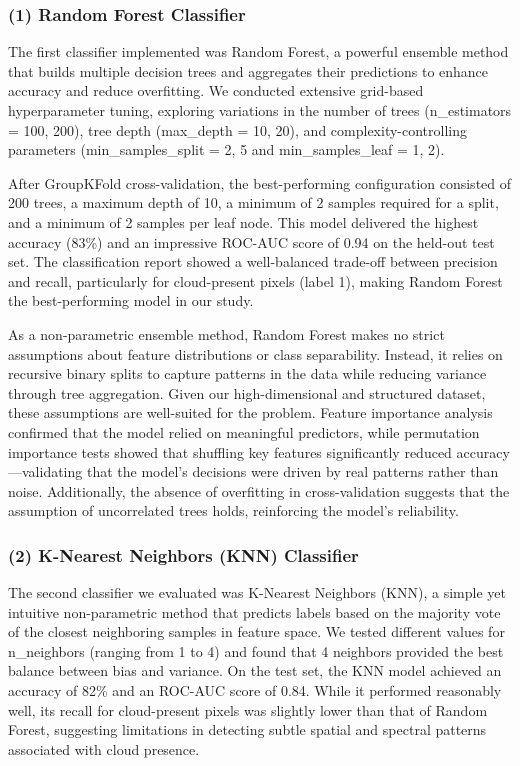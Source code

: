 \documentclass[11pt]{article}
\begin{document}
\subsubsection*{(1) Random Forest
Classifier}\label{random-forest-classifier}

The first classifier implemented was Random Forest, a powerful ensemble
method that builds multiple decision trees and aggregates their
predictions to enhance accuracy and reduce overfitting. We conducted
extensive grid-based hyperparameter tuning, exploring variations in the
number of trees (n\_estimators = 100, 200), tree depth (max\_depth = 10,
20), and complexity-controlling parameters (min\_samples\_split = 2, 5
and min\_samples\_leaf = 1, 2).

After GroupKFold cross-validation, the best-performing configuration
consisted of 200 trees, a maximum depth of 10, a minimum of 2 samples
required for a split, and a minimum of 2 samples per leaf node. This
model delivered the highest accuracy (83\%) and an impressive ROC-AUC
score of 0.94 on the held-out test set. The classification report showed
a well-balanced trade-off between precision and recall, particularly for
cloud-present pixels (label 1), making Random Forest the best-performing
model in our study.

As a non-parametric ensemble method, Random Forest makes no strict
assumptions about feature distributions or class separability. Instead,
it relies on recursive binary splits to capture patterns in the data
while reducing variance through tree aggregation. Given our
high-dimensional and structured dataset, these assumptions are
well-suited for the problem. Feature importance analysis confirmed that
the model relied on meaningful predictors, while permutation importance
tests showed that shuffling key features significantly reduced
accuracy---validating that the model's decisions were driven by real
patterns rather than noise. Additionally, the absence of overfitting in
cross-validation suggests that the assumption of uncorrelated trees
holds, reinforcing the model's reliability.

\subsubsection*{(2) K-Nearest Neighbors (KNN)
Classifier}\label{k-nearest-neighbors-knn-classifier}

The second classifier we evaluated was K-Nearest Neighbors (KNN), a
simple yet intuitive non-parametric method that predicts labels based on
the majority vote of the closest neighboring samples in feature space.
We tested different values for n\_neighbors (ranging from 1 to 4) and
found that 4 neighbors provided the best balance between bias and
variance. On the test set, the KNN model achieved an accuracy of 82\%
and an ROC-AUC score of 0.84. While it performed reasonably well, its
recall for cloud-present pixels was slightly lower than that of Random
Forest, suggesting limitations in detecting subtle spatial and spectral
patterns associated with cloud presence.
\end{document}
